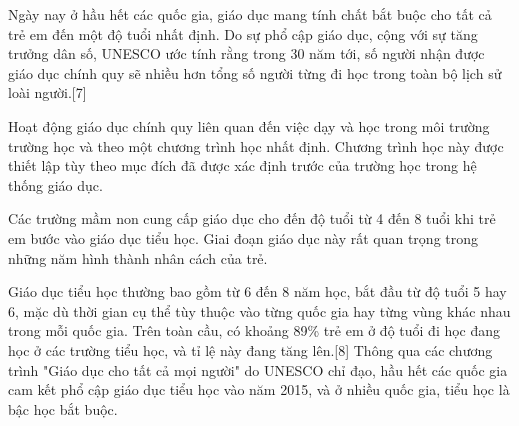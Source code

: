 \documentclass[../thesis.tex]{subfiles}
\begin{document}
Ngày nay ở hầu hết các quốc gia, giáo dục mang tính chất bắt buộc cho tất cả trẻ em đến một độ tuổi nhất định. Do sự phổ cập giáo dục, cộng với sự tăng trưởng dân số, UNESCO ước tính rằng trong 30 năm tới, số người nhận được giáo dục chính quy sẽ nhiều hơn tổng số người từng đi học trong toàn bộ lịch sử loài người.[7]

Hoạt động giáo dục chính quy liên quan đến việc dạy và học trong môi trường trường học và theo một chương trình học nhất định. Chương trình học này được thiết lập tùy theo mục đích đã được xác định trước của trường học trong hệ thống giáo dục.

Các trường mầm non cung cấp giáo dục cho đến độ tuổi từ 4 đến 8 tuổi khi trẻ em bước vào giáo dục tiểu học. Giai đoạn giáo dục này rất quan trọng trong những năm hình thành nhân cách của trẻ.

Giáo dục tiểu học thường bao gồm từ 6 đến 8 năm học, bắt đầu từ độ tuổi 5 hay 6, mặc dù thời gian cụ thể tùy thuộc vào từng quốc gia hay từng vùng khác nhau trong mỗi quốc gia. Trên toàn cầu, có khoảng 89\% trẻ em ở độ tuổi đi học đang học ở các trường tiểu học, và tỉ lệ này đang tăng lên.[8] Thông qua các chương trình "Giáo dục cho tất cả mọi người" do UNESCO chỉ đạo, hầu hết các quốc gia cam kết phổ cập giáo dục tiểu học vào năm 2015, và ở nhiều quốc gia, tiểu học là bậc học bắt buộc.
\end{document}
